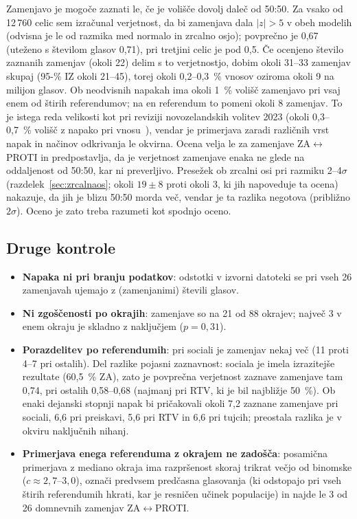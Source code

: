 \documentclass[11pt,a4paper]{article}
\begin{document}
Zamenjavo je mogoče zaznati le, če je volišče dovolj daleč od 50:50. Za vsako od 12\,760 celic sem izračunal verjetnost, da bi zamenjava dala $|z|>5$ v obeh modelih (odvisna je le od razmika med normalo in zrcalno osjo); povprečno je 0,67 (uteženo s številom glasov 0,71), pri tretjini celic je pod 0,5. Če ocenjeno število zaznanih zamenjav (okoli 22) delim s to verjetnostjo, dobim okoli 31--33 zamenjav skupaj (95-\% IZ okoli 21--45), torej okoli 0,2--0,3~\% vnosov oziroma okoli 9 na milijon glasov. Ob neodvisnih napakah ima okoli 1~\% volišč zamenjavo pri vsaj enem od štirih referendumov; na en referendum to pomeni okoli 8 zamenjav. To je istega reda velikosti kot pri reviziji novozelandskih volitev 2023 (okoli 0,3--0,7~\% volišč z napako pri vnosu~\cite{oagnz2024}), vendar je primerjava zaradi različnih vrst napak in načinov odkrivanja le okvirna. Ocena velja le za zamenjave ZA$\leftrightarrow$PROTI in predpostavlja, da je verjetnost zamenjave enaka ne glede na oddaljenost od 50:50, kar ni preverljivo. Presežek ob zrcalni osi pri razmiku 2--4$\sigma$ (razdelek~\ref{sec:zrcalnaos}; okoli $19\pm8$ proti okoli 3, ki jih napoveduje ta ocena) nakazuje, da jih je blizu 50:50 morda več, vendar je ta razlika negotova (približno $2\sigma$). Oceno je zato treba razumeti kot spodnjo oceno.

\subsection{Druge kontrole}
\begin{itemize}
\item \textbf{Napaka ni pri branju podatkov}: odstotki v izvorni datoteki se pri vseh 26 zamenjavah ujemajo z (zamenjanimi) števili glasov.
\item \textbf{Ni zgoščenosti po okrajih}: zamenjave so na 21 od 88 okrajev; največ 3 v enem okraju je skladno z naključjem ($p=0{,}31$).
\item \textbf{Porazdelitev po referendumih}: pri sociali je zamenjav nekaj več (11 proti 4--7 pri ostalih). Del razlike pojasni zaznavnost: sociala je imela izrazitejše rezultate (60,5~\% ZA), zato je povprečna verjetnost zaznave zamenjave tam 0,74, pri ostalih 0,58--0,68 (najmanj pri RTV, ki je bil najbližje 50~\%). Ob enaki dejanski stopnji napak bi pričakovali okoli 7,2 zaznane zamenjave pri sociali, 6,6 pri preiskavi, 5,6 pri RTV in 6,6 pri tujcih; preostala razlika je v okviru naključnih nihanj.
\item \textbf{Primerjava enega referenduma z okrajem ne zadošča}: posamična primerjava z mediano okraja ima razpršenost skoraj trikrat večjo od binomske ($c\approx2{,}7$--$3{,}0$), označi predvsem predčasna glasovanja (ki odstopajo pri vseh štirih referendumih hkrati, kar je resničen učinek populacije) in najde le 3 od 26 domnevnih zamenjav ZA$\leftrightarrow$PROTI.
\end{itemize}
\end{document}
